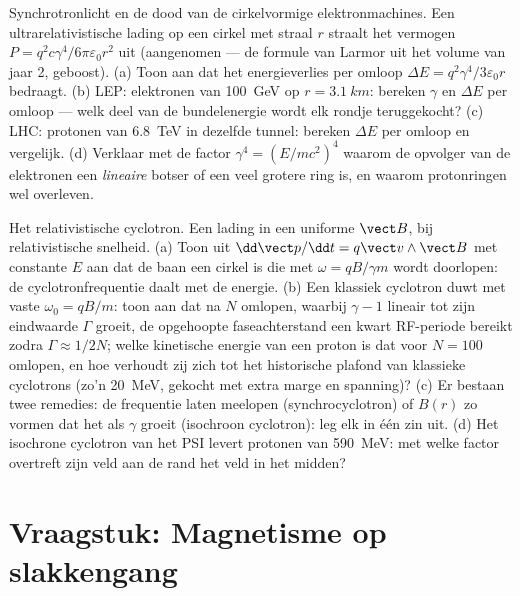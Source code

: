 \begin{exercise}[$\star\star\star$]\label{exo:b3:covariant-electromagnetism:11}
Synchrotronlicht en de dood van de cirkelvormige elektronmachines. Een
ultrarelativistische lading op een cirkel met straal $r$ straalt het
vermogen $P = q^2c\gamma^4/6\pi\varepsilon_0r^2$ uit (aangenomen --- de
formule van Larmor uit het volume van jaar 2, geboost). (a) Toon aan dat
het energieverlies per omloop $\Delta E = q^2\gamma^4/3\varepsilon_0r$
bedraagt. (b) LEP: elektronen van \qty{100}{GeV} op $r = \qty{3.1}{km}$:
bereken $\gamma$ en $\Delta E$ per omloop --- welk deel van de
bundelenergie wordt elk rondje teruggekocht? (c) LHC: protonen van
\qty{6.8}{TeV} in dezelfde tunnel: bereken $\Delta E$ per omloop en
vergelijk. (d) Verklaar met de factor $\gamma^4 =
(E/mc^2)^4$ waarom de
opvolger van de elektronen een \emph{lineaire} botser of een veel grotere
ring is, en waarom protonringen wel overleven.
\end{exercise}

\begin{exercise}[$\star\star\star$]\label{exo:b3:covariant-electromagnetism:12}
Het relativistische cyclotron. Een lading in een uniforme $\vect B$, bij
relativistische snelheid. (a) Toon uit $\dd\vect p/\dd t = q\vect v\wedge\vect
B$ met constante $E$ aan dat de baan een cirkel is die met $\omega = qB/\gamma m$ wordt doorlopen: de cyclotronfrequentie daalt met de energie.
(b) Een klassiek cyclotron duwt met vaste $\omega_0 = qB/m$: toon aan dat
na $N$ omlopen, waarbij $\gamma - 1$ lineair tot zijn eindwaarde $\Gamma$
groeit, de opgehoopte faseachterstand een kwart RF-periode bereikt zodra
$\Gamma \approx 1/2N$; welke kinetische energie van een proton is dat voor
$N = 100$ omlopen, en hoe verhoudt zij zich tot het historische plafond
van klassieke cyclotrons (zo'n \qty{20}{MeV}, gekocht met extra marge en
spanning)? (c) Er bestaan twee remedies: de frequentie laten meelopen
(synchrocyclotron) of $B(r)$ zo vormen dat het als $\gamma$ groeit
(isochroon cyclotron): leg elk in één zin uit. (d) Het isochrone cyclotron
van het PSI levert protonen van \qty{590}{MeV}: met welke factor
overtreft zijn veld aan de rand het veld in het midden?
\end{exercise}

\section{Vraagstuk: Magnetisme op slakkengang}

